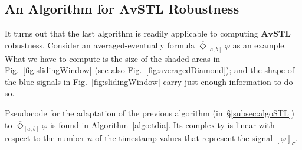 \documentclass[envcountsect,orivec]{llncs} \usepackage{etex} \usepackage[]{graphicx}
\newcommand{\TDiaOp}[1]{\overline{\Diamond}_{#1}}
\newcommand{\AvSTL}{\textbf{AvSTL}}
\begin{document}
\subsection{An Algorithm for $\AvSTL$ Robustness}
\label{subsec:algoAvSTL}
It turns out that the last algorithm is readily applicable to 
computing $\AvSTL$ robustness. Consider an averaged-eventually formula 
$\TDiaOp{[a,b]} \varphi$ as an example. What we have to compute is
the size of the shaded areas in Fig.~\ref{fig:slidingWindow} (see
also Fig.~\ref{fig:averagedDiamond}); and the shape of the blue 
signals in Fig.~\ref{fig:slidingWindow} carry just enough information
to do so. 



Pseudocode for the adaptation of the previous algorithm 
(in~\S{}\ref{subsec:algoSTL}) to
$\TDiaOp{[a,b]} \varphi$ is found in
Algorithm~\ref{algo:tdia}.
Its complexity is linear  with respect to the number $n$ of the timestamp
values that represent the  signal $[\varphi]_{\sigma}$.
\end{document}
